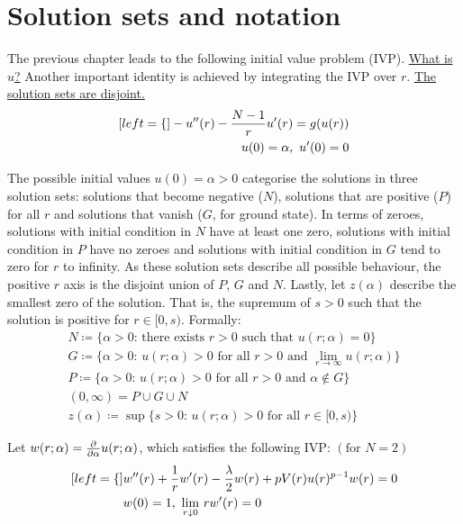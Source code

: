 \section{Solution sets and notation}\label{not}
The previous chapter leads to the following initial value problem (IVP). \underline{What is $u$?} Another important identity is achieved by integrating the IVP over $r$. \underline{The solution sets are disjoint.}
\begin{subequations}\label{ivp}
\begin{align}[left = \empheqlbrace\,]
  -u''(r)-\frac{N-1}{r}u'(r)=g(u(r))\\
  u(0)=\alpha,~u'(0)=0
\end{align}
\end{subequations}

The possible initial values $u(0)=\alpha>0$ categorise the solutions in three solution sets: solutions that become negative ($N$), solutions that are positive ($P$) for all $r$ and solutions that vanish ($G$, for ground state). In terms of zeroes, solutions with initial condition in $N$ have at least one zero, solutions with initial condition in $P$ have no zeroes and solutions with initial condition in $G$ tend to zero for $r$ to infinity. As these solution sets describe all possible behaviour, the positive $r$ axis is the disjoint union of $P$, $G$ and $N$. Lastly, let $z(\alpha)$ describe the smallest zero of the solution. That is, the supremum of $s>0$ such that the solution is positive for $r\in[0,s)$. Formally:
\setlength{\jot}{1em}
\begin{gather*}
  N \coloneqq \text{\{$\alpha>0$: there exists $r>0$ such that $u(r;\alpha)=0$\}} \\
  G \coloneqq \text{\{$\alpha>0$: $u(r;\alpha)>0$ for all $r>0$ and $\underset{r\to\infty}{\lim}u(r;\alpha)$\}} \\
  P \coloneqq \text{\{$\alpha>0$: $u(r;\alpha)>0$ for all $r>0$ and $\alpha\notin G$\}}\\
  (0,\infty) = P\cup G\cup N\\
  z(\alpha) \coloneqq \text{$\sup\{s>0$: $u(r;\alpha)>0$ for all $r\in[0,s)$\}}
\end{gather*}

Let $w(r;\alpha)=\frac{\partial}{\partial\alpha}u(r;\alpha)$, which satisfies the following IVP: $(\text{for }N=2)$
\begin{subequations}\label{wvp}
\begin{align}[left = \empheqlbrace\,]
  &w''(r)+\frac{1}{r}w'(r)-\frac{\lambda}{2}w(r)+pV(r)u(r)^{p-1}w(r)=0\\
  &w(0)=1,~\underset{r\downarrow0}{\lim}~rw'(r)=0
\end{align}
\end{subequations}
